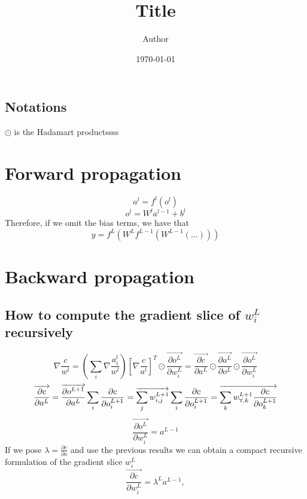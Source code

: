 \documentclass[11pt]{article}
\title{ Title}
\author{ Author }
\date{\today}
\begin{document}
\subsection{Notations}
$\odot$ is the Hadamart productssss

\section{Forward propagation}

\[a^{l} = f^{l}(o^{l})\]
\[o^{l} = W^{l}a^{l-1}+b^{l}\]
Therefore, if we omit the bias terms, we have that
\[
y=
f^L(W^L
	f^{L-1}(W^{L-1}(
		\dots
	))
)
\]



\section{Backward propagation}
\subsection{How to compute the gradient slice of $w_{i}^L$ recursively}
\[
\nabla {\frac{c}{ w^l}} 
= 
(\sum_{i} \nabla \frac{a^{l}_{i}}{ w^l} )
[\nabla \frac{c}{a^l}]^T
\odot
\overrightarrow{\frac{\partial o^L}{\partial w_{i}^L}}
=
\overrightarrow{\frac{\partial c}{\partial a^L}}
\odot
\overrightarrow{\frac{\partial a^L}{\partial o^L}}
\odot
\overrightarrow{\frac{\partial o^L}{\partial w_{i}^L}}
\]
\[
\overrightarrow{\frac{\partial c}{\partial a^L}}
=
\overrightarrow{\frac{\partial o^{L+1}}{\partial a^L}}
\sum_{i} \frac{\partial c}{\partial o^{L+1}_{i}} 
=
\overrightarrow{\sum_{j} w_{i, j}^{L+1}}
\sum_{i} \frac{\partial c}{\partial o^{L+1}_{i}}
=
\overrightarrow{\sum_{k} w_{\forall, k}^{L+1} 
\frac{\partial c}{\partial o^{L+1}_{k}}}\\
\]
\[
\overrightarrow{\frac{\partial o^L}{\partial w_{i}^L}} = a^{L-1}
\]
If we pose $\lambda = \frac{\partial c}{\partial o}$ and use the previous
results we can obtain a compact recursive formulation of the gradient
slice $w_{i}^L$
\[
\overrightarrow{\frac{\partial c}{\partial w_{i}^L}} 
= 
\lambda^{L}a^{L-1}, 
\]
\end{document}
